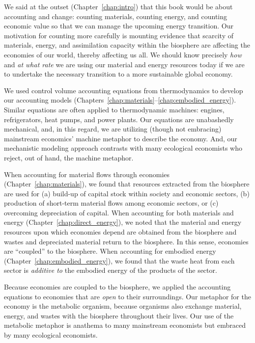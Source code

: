 We said at the outset (Chapter~\ref{chap:intro})
that this book would be about accounting and change:
counting materials, counting energy, and counting economic value
so that we can manage the upcoming energy transition.
Our motivation for counting more carefully
is mounting evidence that 
scarcity of materials, energy, and 
assimilation capacity within the biosphere are affecting
the economies of our world, thereby affecting us all.
We should know precisely \emph{how} and \emph{at what rate} 
we are using our material and energy resources today
if we are to undertake the necessary transition to 
a more sustainable global economy.

We used control volume accounting equations 
from thermodynamics to develop our accounting models 
(Chapters~\ref{chap:materials}--\ref{chap:embodied_energy}).
Similar equations are often applied to thermodynamic machines:
engines, refrigerators, heat pumps, and power plants.
Our equations are unabashedly mechanical, 
and, in this regard, we are utilizing (though not embracing) 
mainstream economics' machine metaphor to describe the economy.
And, our mechanistic modeling approach contrasts 
with many ecological economists
who reject, out of hand, the machine metaphor.

When accounting for material flows through economies (Chapter~\ref{chap:materials}),
we found that resources extracted from the biosphere are used for 
(a) build-up of capital stock within society and economic sectors, 
(b) production of short-term material flows among economic sectors, or
(c) overcoming depreciation of capital.
When accounting for both materials and energy (Chapter~\ref{chap:direct_energy}),
we noted that the material and energy resources upon which economies depend
are obtained from the biosphere and wastes and depreciated
material return to the biosphere.
In this sense, economies are ``coupled'' to the biosphere.
When accounting for embodied energy (Chapter~\ref{chap:embodied_energy}),
we found that the waste heat from each sector 
is \emph{additive to} the embodied energy of the products of the sector.

Because economies are coupled to the biosphere,
we applied the accounting equations 
to economies that are \emph{open} to their surroundings. 
Our metaphor for the economy is the metabolic organism, 
because organisms also exchange material, energy, and wastes with the biosphere
throughout their lives.
Our use of the metabolic metaphor is anathema to many 
mainstream economists but embraced by many ecological economists.

